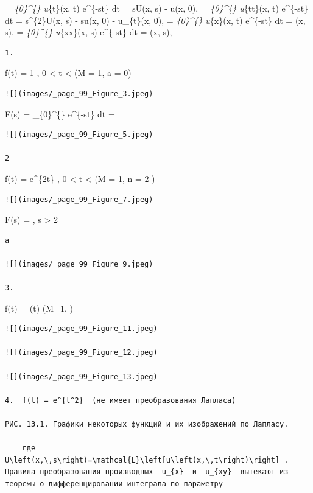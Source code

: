 \documentclass[
  ukrainian,
]{article}
\begin{document}
\left[u_{t}\right] = \int\emph{\{0\}\^{}\{\infty\} u}\{t\}(x,
t) e\^{}\{-st\} dt = sU(x, s) - u(x, 0),
\left[u_{tt}\right] = \int\emph{\{0\}\^{}\{\infty\}
u}\{tt\}(x, t) e\^{}\{-st\} dt = s\^{}\{2\}U(x, s) - su(x, 0) -
u\_\{t\}(x, 0), \left[u_{x}\right] =
\int\emph{\{0\}\^{}\{\infty\} u}\{x\}(x, t) e\^{}\{-st\} dt =
(x, s), \left[u_{xx}\right] =
\int\emph{\{0\}\^{}\{\infty\} u}\{xx\}(x, s) e\^{}\{-st\} dt =
(x, s),

\begin{verbatim}
1.
\end{verbatim}

f(t) = 1 , 0 \textless{} t \textless{} \infty    (M = 1, a = 0)

\begin{verbatim}
![](images/_page_99_Figure_3.jpeg)
\end{verbatim}

F(s) = \int\_\{0\}\^{}\{\infty\} e\^{}\{-st\} dt = 

\begin{verbatim}
![](images/_page_99_Figure_5.jpeg)

2
\end{verbatim}

f(t) = e\^{}\{2t\} , 0 \textless{} t \textless{} \infty (M = 1, n = 2 )

\begin{verbatim}
![](images/_page_99_Figure_7.jpeg)
\end{verbatim}

F(s) =  , s \textgreater{} 2

\begin{verbatim}
a

![](images/_page_99_Figure_9.jpeg)

3.
\end{verbatim}

f(t) = \sin(\omega t) (M=1, )

\begin{verbatim}
![](images/_page_99_Figure_11.jpeg)

![](images/_page_99_Figure_12.jpeg)

![](images/_page_99_Figure_13.jpeg)

4.  f(t) = e^{t^2}  (не имеет преобразования Лапласа)

РИС. 13.1. Графики некоторых функций и их изображений по Лапласу.

    где  U\left(x,\,s\right)=\mathcal{L}\left[u\left(x,\,t\right)\right] . Правила преобразования производных  u_{x}  и  u_{xy}  вытекают из теоремы о дифференцировании интеграла по параметру
\end{verbatim}
\end{document}
